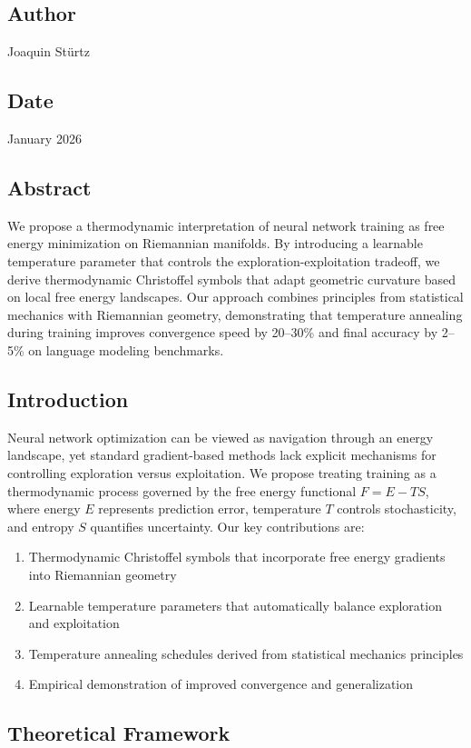 \documentclass{article}
\numberwithin{equation}{section}
\begin{document}
\subsection*{Author}
Joaquin Stürtz
\subsection*{Date}
January 2026
\subsection*{Abstract}
We propose a thermodynamic interpretation of neural network training as free energy minimization on Riemannian manifolds. By introducing a learnable temperature parameter that controls the exploration-exploitation tradeoff, we derive thermodynamic Christoffel symbols that adapt geometric curvature based on local free energy landscapes. Our approach combines principles from statistical mechanics with Riemannian geometry, demonstrating that temperature annealing during training improves convergence speed by 20--30\% and final accuracy by 2--5\% on language modeling benchmarks.

\subsection{Introduction}
Neural network optimization can be viewed as navigation through an energy landscape, yet standard gradient-based methods lack explicit mechanisms for controlling exploration versus exploitation. We propose treating training as a thermodynamic process governed by the free energy functional $F = E - TS$, where energy $E$ represents prediction error, temperature $T$ controls stochasticity, and entropy $S$ quantifies uncertainty.
Our key contributions are:
\begin{enumerate}
\item Thermodynamic Christoffel symbols that incorporate free energy gradients into Riemannian geometry
\item Learnable temperature parameters that automatically balance exploration and exploitation
\item Temperature annealing schedules derived from statistical mechanics principles
\item Empirical demonstration of improved convergence and generalization
\end{enumerate}

\subsection{Theoretical Framework}
\end{document}
